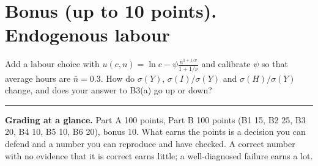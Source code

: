 \documentclass[11pt]{article}
\newif\ifsolutions \solutionsfalse
\newcommand{\solution}[1]{\ifsolutions\medskip
  {\color{blue!45!black}\textbf{Solution.} #1}\medskip\fi}
\begin{document}
\solution{\keyBtwelve}

\section*{Bonus (up to 10 points). Endogenous labour}

Add a labour choice with $u(c,n)=\ln c-\psi\frac{n^{1+1/\nu}}{1+1/\nu}$ and calibrate $\psi$ so that
average hours are $\bar n=0.3$. How do $\sigma(Y)$, $\sigma(I)/\sigma(Y)$ and $\sigma(H)/\sigma(Y)$
change, and does your answer to B3(a) go up or down?

\solution{\keyBeleven}

\vfill
\noindent\rule{\linewidth}{0.4pt}\par
\small
\textbf{Grading at a glance.} Part A 100 points, Part B 100 points (B1 15, B2 25, B3 20, B4 10,
B5 10, B6 20), bonus 10. What earns the points
is a decision you can defend and a number you can reproduce and have checked. A correct number with
no evidence that it is correct earns little; a well-diagnosed failure earns a lot.
\normalsize
\end{document}
